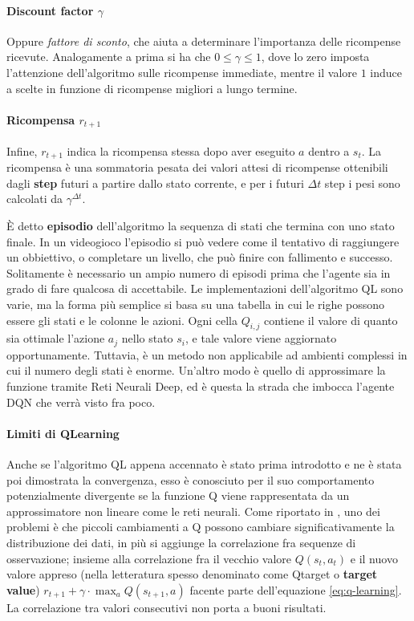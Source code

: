 \documentclass[twoside,twocolumn,10pt]{extarticle}
\theoremstyle{definition}
\begin{document}
		\paragraph*{Discount factor $\gamma$}\label{par:gamma} Oppure \textit{fattore di sconto}, che aiuta a determinare l'importanza delle ricompense ricevute. Analogamente a prima si ha che $0 \leq \gamma \leq 1$, dove lo zero imposta l'attenzione dell'algoritmo sulle ricompense immediate, mentre il valore $1$ induce a scelte in funzione di ricompense migliori a lungo termine.
		
		\paragraph*{Ricompensa $r_{t + 1}$}\label{par:reward} Infine, $r_{t + 1}$ indica la ricompensa stessa dopo aver eseguito $a$ dentro a $s_t$. La ricompensa è una sommatoria pesata dei valori attesi di ricompense ottenibili dagli \textbf{step} futuri a partire dallo stato corrente, e per i futuri $\Delta t$ step i pesi sono calcolati da $\gamma^{\Delta t}$.
		
		È detto \textbf{episodio} dell'algoritmo la sequenza di stati che termina con uno stato finale. In un videogioco l'episodio si può vedere come il tentativo di raggiungere un obbiettivo, o completare un livello, che può finire con fallimento e successo. Solitamente è necessario un ampio numero di episodi prima che l'agente sia in grado di fare qualcosa di accettabile. Le implementazioni dell'algoritmo QL sono varie, ma la forma più semplice si basa su una tabella in cui le righe possono essere gli stati e le colonne le azioni. Ogni cella $Q_{i, j}$ contiene il valore di quanto sia ottimale l'azione $a_j$ nello stato $s_i$, e tale valore viene aggiornato opportunamente. Tuttavia, è un metodo non applicabile ad ambienti complessi in cui il numero degli stati è enorme. Un'altro modo è quello di approssimare la funzione tramite Reti Neurali Deep, ed è questa la strada che imbocca l'agente DQN che verrà visto fra poco.
		
		\paragraph{Limiti di Q\texttwelveudash Learning} Anche se l'algoritmo QL appena accennato è stato prima introdotto e ne è stata poi dimostrata la convergenza, esso è conosciuto per il suo comportamento potenzialmente divergente se la funzione Q viene rappresentata da un approssimatore non lineare come le reti neurali. Come riportato in \cite{bib:dqn}, uno dei problemi è che piccoli cambiamenti a Q possono cambiare significativamente la distribuzione dei dati, in più si aggiunge la correlazione fra sequenze di osservazione; insieme alla correlazione fra il vecchio valore $Q(s_t, a_t)$ e il nuovo valore appreso (nella letteratura spesso denominato come Q\texttwelveudash target o \textbf{target value}) $r_{t + 1} + \gamma \cdot \max_a Q(s_{t + 1}, a)$ facente parte dell'equazione \ref{eq:q-learning}. La correlazione tra valori consecutivi non porta a buoni risultati.
		
\end{document}
